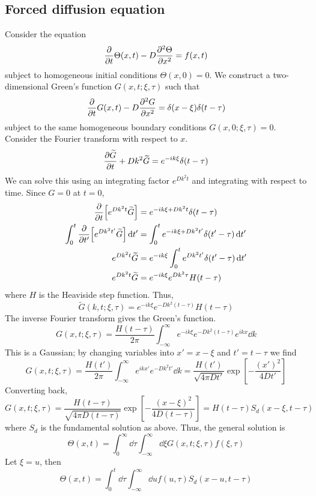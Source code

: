 \documentclass[a4paper]{article}
\begin{document}
\subsection{Forced diffusion equation}
Consider the equation
\[
	\pdv{t}\Theta(x,t) - D \pdv[2]{\Theta}{x}(x,t) = f(x,t)
\]
subject to homogeneous initial conditions \( \Theta(x,0) = 0 \).
We construct a two-dimensional Green's function \( G(x,t; \xi, \tau) \) such that
\[
	\pdv{t}G(x,t) - D \pdv[2]{G}{x}(x,t) = \delta(x - \xi)\delta(t - \tau)
\]
subject to the same homogeneous boundary conditions \( G(x,0;\xi,\tau) = 0 \).
Consider the Fourier transform with respect to \( x \).
\[
	\pdv{\widetilde G}{t} + D k^2 \widetilde G = e^{-ik\xi} \delta(t - \tau)
\]
We can solve this using an integrating factor \( e^{Dk^2 t} \) and integrating with respect to time.
Since \( G = 0 \) at \( t = 0 \),
\begin{align*}
	\pdv{t} \qty[ e^{D k^2 t} \widetilde G ]                    & = e^{-ik\xi + D k^2 t} \delta(t - \tau)                      \\
	\int_0^t \pdv{t'} \qty[ e^{D k^2 t'} \widetilde G ] \dd{t'} & = \int_0^t e^{-ik\xi + D k^2 t'} \delta(t' - \tau) \dd{t'}   \\
	e^{D k^2 t} \widetilde G                                    & = e^{-ik\xi} \int_0^t e^{D k^2 t'} \delta(t' - \tau) \dd{t'} \\
	e^{D k^2 t} \widetilde G                                    & = e^{-ik\xi} e^{D k^2 \tau} H(t - \tau)
\end{align*}
where \( H \) is the Heaviside step function.
Thus,
\[
	\widetilde G(k,t;\xi,\tau) = e^{-ik\xi} e^{-D k^2 (t - \tau)} H(t - \tau)
\]
The inverse Fourier transform gives the Green's function.
\[
	G(x,t;\xi,\tau) = \frac{H(t - \tau)}{2\pi} \int_{-\infty}^\infty e^{-ik\xi} e^{-D k^2 (t - \tau)} e^{ikx} \dd{k}
\]
This is a Gaussian; by changing variables into \( x' = x - \xi \) and \( t' = t - \tau \) we find
\[
	G(x,t;\xi,\tau) = \frac{H(t')}{2\pi} \int_{-\infty}^\infty e^{ikx'} e^{-D k^2 t'} \dd{k} = \frac{H(t')}{\sqrt{4 \pi D t'}} \exp[-\frac{(x')^2}{4Dt'}]
\]
Converting back,
\[
	G(x,t;\xi,\tau) = \frac{H(t - \tau)}{\sqrt{4 \pi D (t - \tau)}} \exp[-\frac{(x - \xi)^2}{4D(t - \tau)}] = H(t-\tau) S_d(x-\xi, t-\tau)
\]
where \( S_d \) is the fundamental solution as above.
Thus, the general solution is
\[
	\Theta(x,t) = \int_0^\infty \dd{\tau} \int_{-\infty}^\infty \dd{\xi} G(x,t;\xi,\tau) f(\xi, \tau)
\]
Let \( \xi = u \), then
\[
	\Theta(x,t) = \int_0^t \dd{\tau} \int_{-\infty}^\infty \dd{u} f(u, \tau) S_d(x-u, t-\tau)
\]
\end{document}
